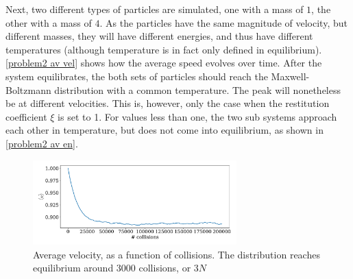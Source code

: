 \documentclass{article}
\begin{document}
    Next, two different types of particles are simulated, one with a mass of $1$, the other with a mass of $4$.
    As the particles have the same magnitude of velocity, but different masses, they will have different energies, and thus have different temperatures (although temperature is in fact only defined in equilibrium).
    \autoref{problem2 av vel} shows how the average speed evolves over time.
    After the system equilibrates, the both sets of particles should reach the Maxwell-Boltzmann distribution with a common temperature.
    The peak will nonetheless be at different velocities.
    This is, however, only the case when the restitution coefficient $\xi$ is set to 1.
    For values less than one, the two sub systems approach each other in temperature, but does not come into equilibrium, as shown in \autoref{problem2 av en}.

    \begin{figure}[H]
        \centering
        \includegraphics[width=0.7\textwidth]{../plots/problem1/v_av.pdf}
        \caption{Average velocity, as a function of collisions.
        The distribution reaches equilibrium around $3000$ collisions, or $3N$}
        \label{problem1 av vel}
    \end{figure}
    
\end{document}
